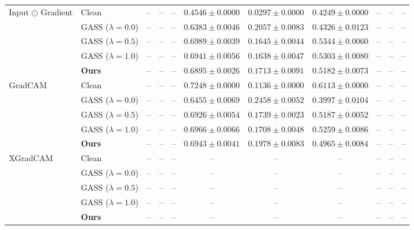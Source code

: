 \begin{table}[t]
{\begin{tabular}{ll|ccc|ccc|ccc}
\multirow{5}{*}{Input $\odot$ Gradient}
& Clean & -- & -- & -- & $0.4546 \pm 0.0000$ & $\mathbf{0.0297 \pm 0.0000}$ & $0.4249 \pm 0.0000$ & -- & -- & -- \\
& GASS ($\lambda=0.0$) & -- & -- & -- & $0.6383 \pm 0.0046$ & $0.2057 \pm 0.0083$ & $0.4326 \pm 0.0123$ & -- & -- & -- \\
& GASS ($\lambda=0.5$) & -- & -- & -- & $\mathbf{0.6989 \pm 0.0039}$ & $0.1645 \pm 0.0044$ & $\mathbf{0.5344 \pm 0.0060}$ & -- & -- & -- \\
& GASS ($\lambda=1.0$) & -- & -- & -- & $0.6941 \pm 0.0056$ & $0.1638 \pm 0.0047$ & $0.5303 \pm 0.0080$ & -- & -- & -- \\
& \textbf{Ours} & -- & -- & -- & $0.6895 \pm 0.0026$ & $0.1713 \pm 0.0091$ & $0.5182 \pm 0.0073$ & -- & -- & -- \\
\midrule

\multirow{5}{*}{GradCAM}
& Clean & -- & -- & -- & $\mathbf{0.7248 \pm 0.0000}$ & $\mathbf{0.1136 \pm 0.0000}$ & $\mathbf{0.6113 \pm 0.0000}$ & -- & -- & -- \\
& GASS ($\lambda=0.0$) & -- & -- & -- & $0.6455 \pm 0.0069$ & $0.2458 \pm 0.0052$ & $0.3997 \pm 0.0104$ & -- & -- & -- \\
& GASS ($\lambda=0.5$) & -- & -- & -- & $0.6926 \pm 0.0054$ & $0.1739 \pm 0.0023$ & $0.5187 \pm 0.0052$ & -- & -- & -- \\
& GASS ($\lambda=1.0$) & -- & -- & -- & $0.6966 \pm 0.0066$ & $0.1708 \pm 0.0048$ & $0.5259 \pm 0.0086$ & -- & -- & -- \\
& \textbf{Ours} & -- & -- & -- & $0.6943 \pm 0.0041$ & $0.1978 \pm 0.0083$ & $0.4965 \pm 0.0084$ & -- & -- & -- \\
\midrule

\multirow{5}{*}{XGradCAM}
& Clean & -- & -- & -- & -- & -- & -- & -- & -- & -- \\
& GASS ($\lambda=0.0$) & -- & -- & -- & -- & -- & -- & -- & -- & -- \\
& GASS ($\lambda=0.5$) & -- & -- & -- & -- & -- & -- & -- & -- & -- \\
& GASS ($\lambda=1.0$) & -- & -- & -- & -- & -- & -- & -- & -- & -- \\
& \textbf{Ours} & -- & -- & -- & -- & -- & -- & -- & -- & -- \\

\bottomrule
\end{tabular}
}

\vspace{0.5cm}


\end{table}
